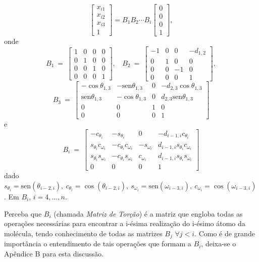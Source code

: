 \documentclass[a4paper,12pt]{article}
\begin{document}
 	$$
 	\begin{bmatrix}
 	x_{i1}\\ 
 	x_{i2}\\ 
 	x_{i3}\\ 
 	1
 	\end{bmatrix}
 	= B_{1}B_{2}\cdots B_{i}\begin{bmatrix}
 	0\\ 
 	0\\ 
 	0\\ 
 	1
 	\end{bmatrix},
 	$$
 	onde
 	$$
 	B_1\: =\:
 	\begin{bmatrix}
 	1 & 0 & 0 & 0\\ 
 	0 & 1 & 0 & 0\\ 
 	0 & 0 & 1 & 0\\ 
 	0 & 0 & 0 & 1
 	\end{bmatrix},\:\:\:
 	\: B_2\: =\:
 	\begin{bmatrix}
 	-1 & 0 & 0 & -d_{1,2}\\
 	0 & 1 & 0 & 0\\ 
 	0 & 0 & -1 & 0\\ 
 	0 & 0 & 0 & 1
 	\end{bmatrix},
 	$$
 	$$
 	B_3\:=\:
 	\begin{bmatrix}
 	-\cos\theta_{1,3} & -\mbox{sen}\theta_{1,3} & 0 & -d_{2,3}\cos\theta_{1,3}\\ 
 	\mbox{sen}\theta_{1,3} & -\cos\theta_{1,3} & 0 & d_{2,3}\mbox{sen}\theta_{1,3}\\ 
 	0 & 0 & 1 & 0\\ 
 	0 & 0 & 0 & 1
 	\end{bmatrix}
 	$$
 	e
 	$$
 	B_i\:=\:
 	\begin{bmatrix}
 	-c_{\theta_{i}} & -s_{\theta_{i}} & 0 & -d_{i-1,i}c_{\theta_{i}}\\ 
 	s_{\theta_{i}}c_{\omega_{i}} & -c_{\theta_{i}}c_{\omega_{i}}
 	& -s_{\omega_{i}} & d_{i-1,i}s_{\theta_{i}}c_{\omega_{i}}\\ 
 	s_{\theta_{i}}s_{\omega_{i}} & -c_{\theta_{i}}s_{\omega_{i}} & c_{\omega_{i}} & d_{i-1,i}s_{\theta_{i}}s_{\omega_{i}}\\ 
 	0 & 0 & 0 & 1
 	\end{bmatrix}
 	$$
 	dado $s_{\theta_{i}}=\mbox{sen} (\theta_{i-2, i}),\: c_{\theta_{i}}=\cos (\theta_{i-2, i}),\: s_{\omega_{i}}=\mbox{sen} (\omega_{i-3, i}),\: c_{\omega_{i}}=\cos (\omega_{i-3, i})$. Em $B_i$, $i=4, ..., n$.
 	
 	
 	Perceba que $B_i$ (chamada \textit{Matriz de Torção}) é a matriz que engloba todas as operações necessárias para encontrar a i-ésima realização do i-ésimo átomo da molécula, tendo conhecimento de todas as matrizes $B_j$ $\forall j < i$. Como é de grande importância o entendimento de tais operações que formam a $B_i$, deixa-se o Apêndice B para esta discussão.
 	
\end{document}
